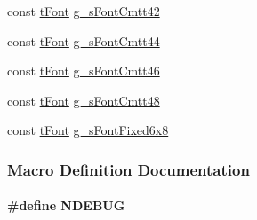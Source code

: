 \begin{DoxyCompactItemize}
\item 
const \hyperlink{structt_font}{t\+Font} \hyperlink{group__primitives__api_ga843f726850fa7e39ad0bda97915cb8d0}{g\+\_\+s\+Font\+Cmtt42}
\item 
const \hyperlink{structt_font}{t\+Font} \hyperlink{group__primitives__api_ga5512c3e9000658899378acd15b9443af}{g\+\_\+s\+Font\+Cmtt44}
\item 
const \hyperlink{structt_font}{t\+Font} \hyperlink{group__primitives__api_ga18b44bfbc08558e8b050befaf12aa82d}{g\+\_\+s\+Font\+Cmtt46}
\item 
const \hyperlink{structt_font}{t\+Font} \hyperlink{group__primitives__api_gab7c00d3e93612bcbb6f93f6256feefa4}{g\+\_\+s\+Font\+Cmtt48}
\item 
const \hyperlink{structt_font}{t\+Font} \hyperlink{group__primitives__api_ga96f4c7b60b2da06258398944eceea83f}{g\+\_\+s\+Font\+Fixed6x8}
\end{DoxyCompactItemize}


\subsubsection{Macro Definition Documentation}
\paragraph[{N\+D\+E\+B\+U\+G}]{\setlength{\rightskip}{0pt plus 5cm}\#define N\+D\+E\+B\+U\+G}\label{grlib_8h_a8de3ed741dadc9c979a4ff17c0a9116e}
